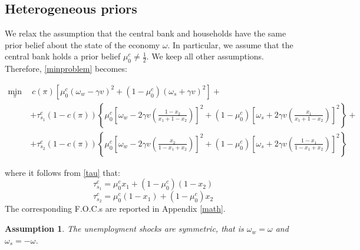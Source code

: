 \documentclass[12pt,a4paper]{article}
\newtheorem{assumption}{Assumption}
\begin{document}
\subsection{Heterogeneous priors}
We relax the assumption that the central bank and households have the same prior belief about the state of the economy $\omega$. In particular, we assume that the central bank holds a prior belief $\mu_0^c\neq \frac{1}{2}$. We keep all other assumptions. Therefore, \eqref{minproblem} becomes:
\begin{small}
    \begin{equation}
    \begin{split}
    \min_{\pi} \ & \ c(\pi)\left[\mu_0^c(\omega_w-\gamma v)^2+(1-\mu_0^c)(\omega_s+\gamma v)^2\right]+\\
     &  +\tau_{s_1}^c(1-c(\pi))\left\{\mu_0^c\left[\omega_w-2\gamma v\left(\frac{1-x_2}{x_1+1-x_2}\right)\right]^2+(1-\mu_0^c)\left[\omega_s+2\gamma v\left(\frac{x_1}{x_1+1-x_2}\right)\right]^2\right\}+ \\
     & +\tau_{s_2}^c(1-c(\pi))\left\{\mu_0^c\left[\omega_w-2\gamma v\left(\frac{x_2}{1-x_1+x_2}\right)\right]^2+(1-\mu_0^c)\left[\omega_s+2\gamma v\left(\frac{1-x_1}{1-x_1+x_2}\right)\right]^2\right\}
    \end{split}
    \label{opt_heterogeneous_priors}
    \end{equation}
\end{small}
where it follows from \eqref{tau} that:
\begin{equation}
    \tau_{s_1}^c=\mu_0^c x_1 + (1-\mu_0^c)(1-x_2)
\end{equation}
\begin{equation}
    \tau_{s_2}^c=\mu_0^c (1-x_1) + (1-\mu_0^c)x_2
\end{equation}
The corresponding F.O.C.s are reported in Appendix \ref{math}.
\begin{assumption}
\label{Ass3}
    The unemployment shocks are symmetric, that is $\omega_w=\omega$ and $\omega_s=-\omega$.
\end{assumption}
\end{document}
